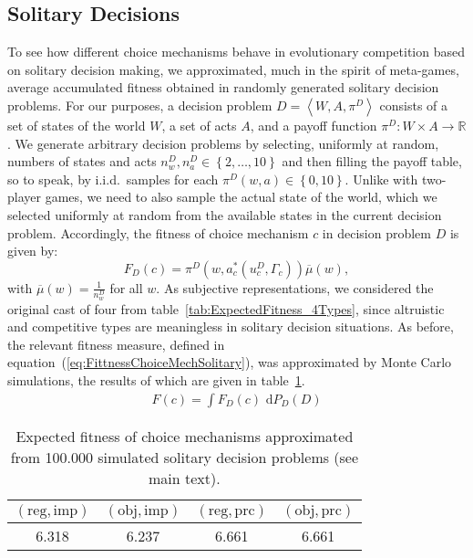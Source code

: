 \documentclass[fleqn,reqno,12pt]{article}
\theoremstyle{Satz}
\theoremstyle{Bsp}
\newcommand{\set}[1]{\left\{#1\right\}}
\newcommand{\tuple}[1]{\left \langle #1\right\rangle}
\newcommand{\Acts}{\ensuremath{A}\xspace}		%
\newcommand{\act}{\ensuremath{a}\xspace}		%
\begin{document}
\subsection{Solitary Decisions}
\label{sec:solitary-decisions}

To see how different choice mechanisms behave in evolutionary competition based on solitary
decision making, we approximated, much in the spirit of meta-games, average accumulated
fitness obtained in randomly generated solitary decision problems. For our purposes, a decision
problem $D=\tuple{W, \Acts, \pi^D}$ consists of a set of states of the world $W$, a set of acts $\Acts$, and
a payoff function $\pi^D: W \times \Acts \rightarrow \mathbb{R}$.  We generate arbitrary
decision problems by selecting, uniformly at random, numbers of states and acts
$n^{D}_w, n^{D}_\act \in \set{2, \dots, 10}$ and then filling the payoff table, so to speak, by
i.i.d.~samples for each $\pi^D(w, \act) \in \set{0, 10}$. Unlike with
two-player games, we need to also sample the actual state of the world, which we selected
uniformly at random from the available states in the current decision problem. Accordingly, the fitness of choice mechanism $c$ in decision problem $D$ is given by:
$$F_D(c)= \pi^D(w,a_c^*(u_c^D,\Gamma_c))\overline{\mu}(w),$$ with $ \overline{\mu}(w)= \frac{1}{n_w^D}$ for all $w$.
As subjective representations,
we considered the original cast of four from table~\ref{tab:ExpectedFitness_4Types}, since altruistic and
competitive types are meaningless in solitary decision situations. As before, the
relevant fitness measure, defined in equation~(\ref{eq:FittnessChoiceMechSolitary}), was
approximated by Monte Carlo simulations, the results of which are given in
table~\ref{tab:SolitaryDecisions}.
\begin{align}
  \label{eq:FittnessChoiceMechSolitary}
  F(c) = \int  F_D(c) \text{ d} P_{D}(D) 
\end{align}
\begin{table}
  \centering
  \begin{tabular}{cccc}
    \toprule
   $(\text{reg}, \text{imp})$ 
 & $(\text{obj}, \text{imp})$ 
 & $(\text{reg}, \text{prc})$ 
 & $(\text{obj}, \text{prc})$ 
 \\ \midrule
    6.318 & 6.237 & 6.661 & 6.661 \\ \bottomrule
  \end{tabular}
  \caption{Expected fitness of choice mechanisms approximated from 100.000 simulated solitary
    decision problems (see main text).}
  \label{tab:SolitaryDecisions}
\end{table}
\end{document}
